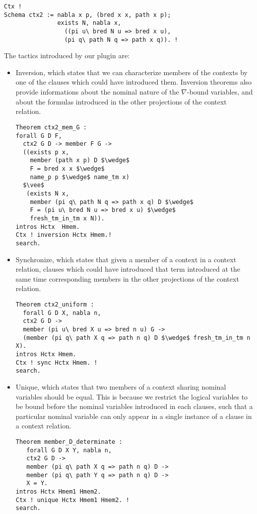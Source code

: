 \documentclass[nocopyrightspace,authoryear]{sigplanconf}
\begin{document}
\begin{lstlisting}
Ctx !
Schema ctx2 := nabla x p, (bred x x, path x p);
               exists N, nabla x, 
                 ((pi u\ bred N u => bred x u), 
                 (pi q\ path N q => path x q)). !
\end{lstlisting}


The tactics introduced by our plugin are:
\begin{itemize}
\item Inversion, which states that we can characterize members of the contexts by one of the clauses which could have introduced them. Inversion theorems also provide informations about the nominal nature of the $\nabla$-bound variables, and about the formulas introduced in the other projections of the context relation.

\begin{lstlisting}
Theorem ctx2_mem_G :
forall G D F,
  ctx2 G D -> member F G ->
  ((exists p x, 
    member (path x p) D $\wedge$
    F = bred x x $\wedge$  
    name_p p $\wedge$ name_tm x)
  $\vee$
   (exists N x, 
    member (pi q\ path N q => path x q) D $\wedge$ 
    F = (pi u\ bred N u => bred x u) $\wedge$  
    fresh_tm_in_tm x N)).
intros Hctx  Hmem. 
Ctx ! inversion Hctx Hmem.! 
search.
\end{lstlisting}

\item Synchronize, which states that given a member of a context in a context relation, clauses which could have introduced that term introduced at the same time corresponding members in the other projections of the context relation.
\begin{lstlisting}
Theorem ctx2_uniform :
  forall G D X, nabla n,
  ctx2 G D ->
  member (pi u\ bred X u => bred n u) G ->
  (member (pi q\ path X q => path n q) D $\wedge$ fresh_tm_in_tm n X).
intros Hctx Hmem. 
Ctx ! sync Hctx Hmem. ! 
search.
\end{lstlisting}

\item Unique, which states that two members of a context sharing nominal variables should be equal. This is because we restrict the logical variables to be bound before the nominal variables introduced in each clauses, such that a particular nominal variable can only appear in a single instance of a clause in a context relation.   

\begin{lstlisting}
Theorem member_D_determinate :
   forall G D X Y, nabla n,
   ctx2 G D ->
   member (pi q\ path X q => path n q) D ->
   member (pi q\ path Y q => path n q) D ->
   X = Y.
intros Hctx Hmem1 Hmem2. 
Ctx ! unique Hctx Hmem1 Hmem2. ! 
search.
\end{lstlisting}


\end{itemize}
\end{document}
